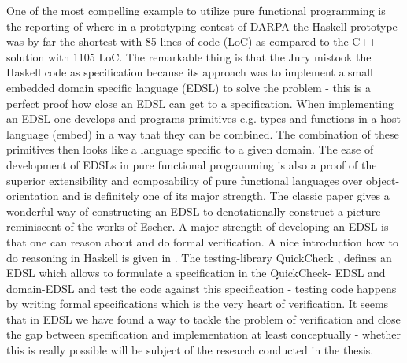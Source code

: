One of the most compelling example to utilize pure functional programming is the reporting of \cite{hudak_haskell_1994} where in a prototyping contest of DARPA the Haskell prototype was by far the shortest with 85 lines of code (LoC) as compared to the C++ solution with 1105 LoC. The remarkable thing is that the Jury mistook the Haskell code as specification because its approach was to implement a small embedded domain specific language (EDSL) to solve the problem - this is a perfect proof how close an EDSL can get to a specification. When implementing an EDSL one develops and programs primitives e.g. types and functions in a host language (embed) in a way that they can be combined. The combination of these primitives then looks like a language specific to a given domain. The ease of development of EDSLs in pure functional programming is also a proof of the superior extensibility and composability of pure functional languages over object-orientation and is definitely one of its major strength. The classic paper \cite{henderson_functional_1982} gives a wonderful way of constructing an EDSL to denotationally construct a picture reminiscent of the works of Escher.
A major strength of developing an EDSL is that one can reason about and do formal verification. A nice introduction how to do reasoning in Haskell is given in \cite{hutton_tutorial_1999}.
The testing-library QuickCheck \cite{claessen_quickcheck:_2000}, \cite{claessen_testing_2002} defines an EDSL which allows to formulate a specification in the QuickCheck- EDSL and domain-EDSL and test the code against this specification - testing code happens by writing formal specifications which is the very heart of verification. 
It seems that in EDSL we have found a way to tackle the problem of verification and close the gap between specification and implementation at least conceptually - whether this is really possible will be subject of the research conducted in the thesis.

